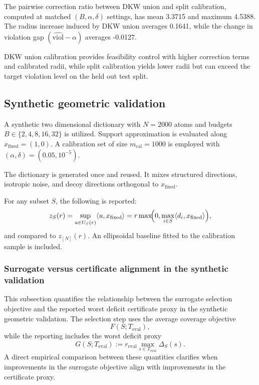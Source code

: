 \documentclass[accepted]{uai2026}
\theoremstyle{plain}
\theoremstyle{definition}
\theoremstyle{remark}
\begin{document}
The pairwise correction ratio between DKW union and split calibration, computed at matched $(B,\alpha,\delta)$ settings, has mean 3.3715 and maximum 4.5388. The radius increase induced by DKW union averages 0.1641, while the change in violation gap $(\widehat{\mathrm{viol}}-\alpha)$ averages -0.0127.

DKW union calibration provides feasibility control with higher correction terms and calibrated radii, while split calibration yields lower radii but can exceed the target violation level on the held out test split.

\subsection{Synthetic geometric validation}
\label{app:teacher-details}

A synthetic two dimensional dictionary with $N=2000$ atoms and budgets $B\in\{2,4,8,16,32\}$ is utilized. Support approximation is evaluated along $x_{\mathrm{fixed}}=(1,0)$. A calibration set of size $m_{\mathrm{cal}}=1000$ is employed with $(\alpha,\delta)=(0.05,10^{-5})$.

The dictionary is generated once and reused. It mixes structured directions, isotropic noise, and decoy directions orthogonal to $x_{\mathrm{fixed}}$.

For any subset $S$, the following is reported:
\[
z_S(r)=\sup_{u\in U_S(r)}\langle u,x_{\mathrm{fixed}}\rangle
=r\max\!\Bigl(0,\max_{i\in S}\langle d_i,x_{\mathrm{fixed}}\rangle\Bigr),
\]
and compared to $z_{[N]}(r)$. An ellipsoidal baseline fitted to the calibration sample is included.

\subsubsection{Surrogate versus certificate alignment in the synthetic validation}
\label{app:surrogate_vs_certificate}

This subsection quantifies the relationship between the surrogate selection objective and the reported worst deficit certificate proxy in the synthetic geometric validation. The selection step uses the average coverage objective
\[
F(S;T_{\mathrm{eval}}),
\]
while the reporting includes the worst deficit proxy
\[
G(S;T_{\mathrm{eval}})
:= r_{\mathrm{eval}} \max_{s \in T_{\mathrm{eval}}} \Delta_S(s).
\]
A direct empirical comparison between these quantities clarifies when improvements in the surrogate objective align with improvements in the certificate proxy.
\end{document}
